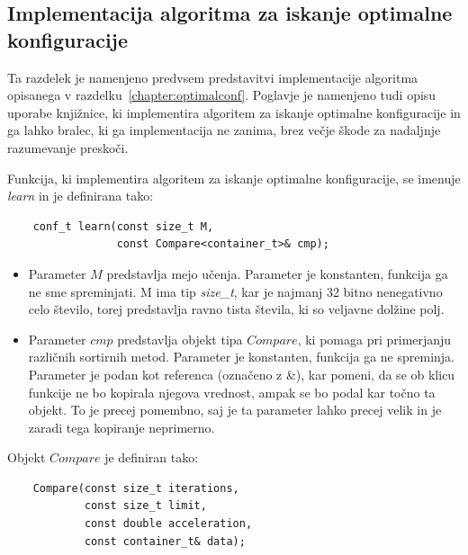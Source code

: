 \documentclass[a4paper,oneside,12pt]{article}
\begin{document}
\subsection{Implementacija algoritma za iskanje optimalne konfiguracije}
\label{chapter:optimalconfimplementation}
Ta razdelek je namenjeno predvsem predstavitvi implementacije algoritma opisanega v
razdelku~\ref{chapter:optimalconf}. Poglavje je namenjeno tudi opisu uporabe knjižnice, ki
implementira algoritem za iskanje optimalne konfiguracije in ga lahko bralec, ki ga
implementacija ne zanima, brez večje škode za nadaljnje razumevanje preskoči.

Funkcija, ki implementira algoritem za iskanje optimalne konfiguracije, 
se imenuje \emph{learn} in je definirana tako:

\begin{lstlisting}
    conf_t learn(const size_t M, 
                 const Compare<container_t>& cmp);
\end{lstlisting}

\begin{itemize}
  \item Parameter $M$ predstavlja mejo učenja. Parameter je
    konstanten, funkcija ga ne sme spreminjati. M ima tip \emph{size\_t}, kar je najmanj 32
    bitno nenegativno celo število, torej predstavlja ravno tista števila, ki so veljavne
    dolžine polj.
  \item Parameter $cmp$ predstavlja objekt tipa $Compare$, ki pomaga pri primerjanju
    različnih sortirnih metod. Parameter je konstanten, funkcija ga ne spreminja.
    Parameter je podan kot referenca (označeno z \&), kar pomeni, da se ob klicu funkcije
    ne bo kopirala njegova vrednost, ampak se bo podal kar točno ta objekt. To je precej
    pomembno, saj je  ta parameter lahko precej velik in je zaradi tega
    kopiranje neprimerno. 
\end{itemize}

Objekt $Compare$ je definiran tako:
\begin{lstlisting}
    Compare(const size_t iterations, 
            const size_t limit, 
            const double acceleration, 
            const container_t& data);
\end{lstlisting}
\end{document}
